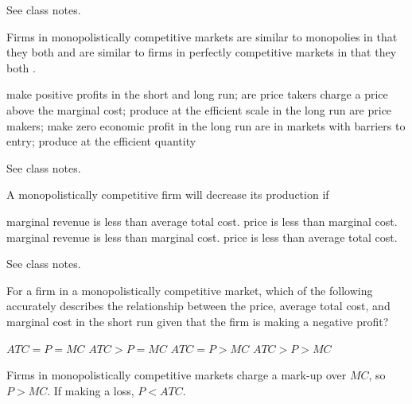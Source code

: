 \documentclass[addpoints,11pt]{exam}
\theoremstyle{definition}
\newcommand{\blank}[0]{\underline{\hspace{3cm}}}
\begin{document}
\begin{questions}
		\begin{solution}
			See class notes.
		\end{solution}
		
	\question Firms in monopolistically competitive markets are similar to monopolies in that they both \blank and are similar to firms in perfectly competitive markets in that they both \blank.
			
			\begin{choices}
				\choice make positive profits in the short and long run; are price takers
				\choice charge a price above the marginal cost; produce at the efficient scale in the long run
				\CorrectChoice are price makers; make zero economic profit in the long run
				\choice are in markets with barriers to entry; produce at the efficient quantity
			\end{choices}
			
		\begin{solution}
			See class notes.
		\end{solution}
			
	\question A monopolistically competitive firm will decrease its production if
		
		\begin{choices}
			\choice marginal revenue is less than average total cost.
			\choice price is less than marginal cost.
			\CorrectChoice marginal revenue is less than marginal cost.
			\choice price is less than average total cost.
		\end{choices}
		
		\begin{solution}
			See class notes.
		\end{solution}
		
		\newpage
			
			
		\question For a firm in a monopolistically competitive market, which of the following accurately describes the relationship between the price, average total cost, and marginal cost in the short run given that the firm is making a negative profit?
		
		\begin{choices}
			\choice $ATC = P = MC$
			\choice $ATC > P = MC$
			\choice $ATC = P > MC$
			\CorrectChoice $ATC > P > MC$
		\end{choices}
		
		\begin{solution}
			Firms in monopolistically competitive markets charge a mark-up over $MC$, so $P>MC$. If making a loss, $P<ATC$.
		\end{solution}
			

\end{questions}
\end{document}
